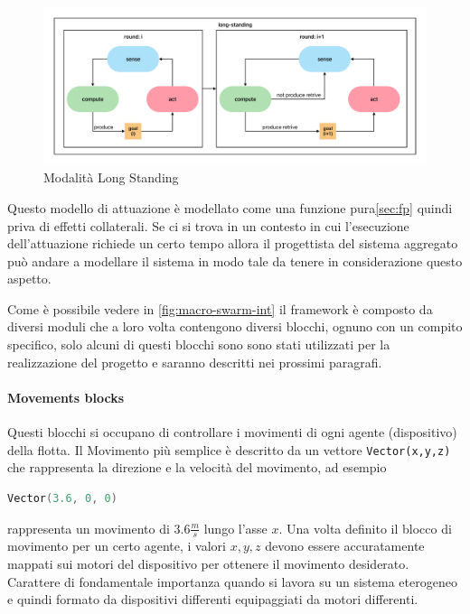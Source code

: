 \documentclass[12pt,a4paper,openright,twoside]{book}
\begin{document}
\begin{figure}
    \centering
    \includegraphics[width=.99\linewidth]{figures/long-standing.pdf}
    \caption{Modalità Long Standing}
    \label{fig:long-standong}
\end{figure}

Questo modello di attuazione è modellato come una funzione pura\cref{sec:fp} quindi priva di effetti collaterali. Se ci si trova in un contesto in cui l'esecuzione dell'attuazione richiede un certo tempo allora il progettista del sistema aggregato può andare a modellare il sistema in modo tale da tenere in considerazione questo aspetto.

Come è possibile vedere in \cref{fig:macro-swarm-int} \cite{Macroswarm} il framework è composto da diversi moduli che a loro volta contengono diversi blocchi, ognuno con un compito specifico, solo alcuni di questi blocchi sono sono stati utilizzati per la realizzazione del progetto e saranno descritti nei prossimi paragrafi.

\paragraph{Movements blocks} 
Questi blocchi si occupano di controllare i movimenti di ogni agente (dispositivo) della flotta. Il Movimento più semplice è descritto da un vettore \verb|Vector(x,y,z)| che rappresenta la direzione e la velocità del movimento, ad esempio 

\begin{lstlisting}[language=Scala, label={lst:vector-example}]
    Vector(3.6, 0, 0)
\end{lstlisting}

rappresenta un movimento di $3.6 \frac{m}{s}$ lungo l'asse $x$. Una volta definito il blocco di movimento per un certo agente, i valori $x,y,z$ devono essere accuratamente mappati sui motori del dispositivo per ottenere il movimento desiderato. Carattere di fondamentale importanza quando si lavora su un sistema eterogeneo e quindi formato da dispositivi differenti equipaggiati da motori differenti.
\end{document}
